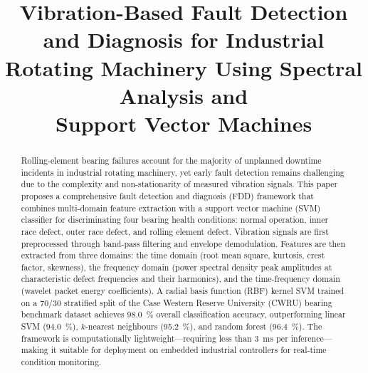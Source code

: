\documentclass[conference,a4paper]{IEEEtran}[2015/08/26]
\begin{document}

\title{Vibration-Based Fault Detection and Diagnosis for Industrial\\
       Rotating Machinery Using Spectral Analysis and\\
       Support Vector Machines}

\author{%
}

\maketitle

\begin{abstract}
Rolling-element bearing failures account for the majority of unplanned
downtime incidents in industrial rotating machinery, yet early fault
detection remains challenging due to the complexity and non-stationarity
of measured vibration signals. This paper proposes a comprehensive
fault detection and diagnosis (FDD) framework that combines multi-domain
feature extraction with a support vector machine (SVM) classifier for
discriminating four bearing health conditions: normal operation, inner
race defect, outer race defect, and rolling element defect. Vibration
signals are first preprocessed through band-pass filtering and envelope
demodulation. Features are then extracted from three domains: the
time domain (root mean square, kurtosis, crest factor, skewness),
the frequency domain (power spectral density peak amplitudes at
characteristic defect frequencies and their harmonics), and the
time-frequency domain (wavelet packet energy coefficients). A
radial basis function (RBF) kernel SVM trained on a 70/30
stratified split of the Case Western Reserve University (CWRU) bearing
benchmark dataset achieves \SI{98.0}{\percent} overall classification
accuracy, outperforming linear SVM (\SI{94.0}{\percent}), $k$-nearest
neighbours (\SI{95.2}{\percent}), and random forest (\SI{96.4}{\percent}).
The framework is computationally lightweight---requiring less than
\SI{3}{\milli\second} per inference---making it suitable for deployment
on embedded industrial controllers for real-time condition monitoring.
\end{abstract}
\end{document}
